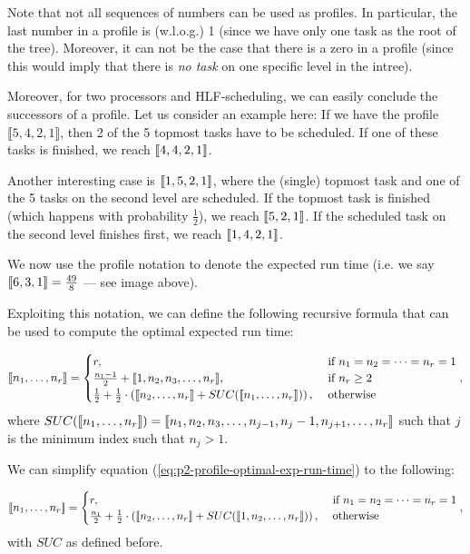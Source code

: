Note that not all sequences of numbers can be used as profiles. In particular, the last number in a profile is (w.l.o.g.) 1 (since we have only one task as the root of the tree). Moreover, it can not be the case that there is a zero in a profile (since this would imply that there is \emph{no task} on one specific level in the intree).

Moreover, for two processors and HLF-scheduling, we can easily conclude the successors of a profile. Let us consider an example here: If we have the profile $\llbracket 5,4,2,1 \rrbracket$, then 2 of the 5 topmost tasks have to be scheduled. If one of these tasks is finished, we reach $\llbracket 4,4,2,1 \rrbracket$.

Another interesting case is $\llbracket 1,5,2,1 \rrbracket$, where the (single) topmost task and one of the 5 tasks on the second level are scheduled. If the topmost task is finished (which happens with probability $\frac{1}{2}$), we reach $\llbracket 5,2,1 \rrbracket$. If the scheduled task on the second level finishes first, we reach $\llbracket 1,4,2,1 \rrbracket$.

We now use the profile notation to denote the expected run time (i.e. we say $\llbracket 6,3,1 \rrbracket = \frac{49}{8}$ --- see image above).

Exploiting this notation, we can define the following recursive formula that can be used to compute the optimal expected run time:

\begin{equation}
  \label{eq:p2-profile-optimal-exp-run-time}
  \llbracket n_1, \dots, n_r \rrbracket =
  \begin{cases}
    r, & \text{ if } n_1 = n_2 = \dots = n_r = 1 \\
    \frac{n_1-1}{2} + \llbracket 1, n_2, n_3, \dots, n_r \rrbracket , & \text{ if } n_r\geq 2 \\
    \frac{1}{2} + \frac{1}{2} \cdot \left( \llbracket n_2, \dots, n_r \rrbracket + SUC(\llbracket n_1,\dots,n_r \rrbracket) \right) ,& \text{ otherwise }
  \end{cases},
\end{equation}
where $SUC(\llbracket n_1,\dots,n_r \rrbracket) = \llbracket n_1, n_2, n_3,\dots,n_{j-1},n_j-1,n_{j+1},\dots,n_r \rrbracket$ such that $j$ is the minimum index such that $n_j>1$.

We can simplify equation (\ref{eq:p2-profile-optimal-exp-run-time}) to the following:

\begin{equation}
  \label{eq:p2-profile-optimal-exp-run-time-def-simplified}
  \llbracket n_1, \dots, n_r \rrbracket =
  \begin{cases}
    r, & \text{ if } n_1 = n_2 = \dots = n_r = 1 \\
    \frac{n_1}{2} + \frac{1}{2} \cdot \left( \llbracket n_2, \dots, n_r \rrbracket + SUC(\llbracket 1,n_2,\dots,n_r \rrbracket) \right) ,& \text{ otherwise }
  \end{cases},
\end{equation}
with $SUC$ as defined before.


